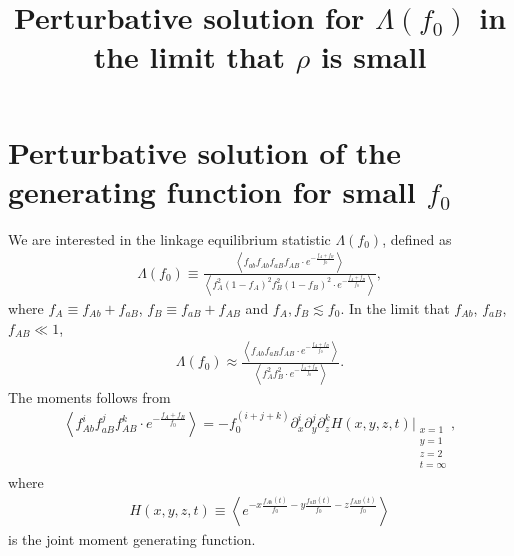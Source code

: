 \documentclass[11pt]{article}
\title{\vspace{-36 pt} \Large Perturbative solution for $\Lambda(f_0)$ in the limit that $\rho$ is small \vspace{-36 pt}}
\date{}
\begin{document}
\section*{Perturbative solution of the generating function for small $f_0$}
We are interested in the linkage equilibrium statistic $\Lambda(f_0)$, defined as
\begin{align}
    \Lambda(f_0) \equiv \frac{\left\langle f_{ab}f_{Ab}f_{aB}f_{AB} \cdot e^{-\frac{f_{A}+f_{B}}{f_0}}\right\rangle}{\left\langle f_A^2(1-f_A)^2f_B^2(1-f_B)^2\cdot e^{-\frac{f_{A}+f_{B}}{f_0}}\right\rangle},
\end{align}
where $f_A \equiv f_{Ab} + f_{aB}$, $f_B \equiv f_{aB} + f_{AB}$ and $f_A, f_B \lesssim f_0$.
In the limit that $f_{Ab}$, $f_{aB}$, $f_{AB} \ll1$, 
\begin{align}\label{eq:lambda_small_f}
    \Lambda(f_0) \approx \frac{\left\langle f_{Ab}f_{aB}f_{AB} \cdot e^{-\frac{f_{A}+f_{B}}{f_0}}\right\rangle}{\left\langle f_A^2f_B^2\cdot e^{-\frac{f_{A}+f_{B}}{f_0}}\right\rangle}.
\end{align}
The moments follows from 
\begin{align}\label{eq:lambda_numerator}
    \left\langle f_{Ab}^if_{aB}^jf_{AB}^k\cdot e^{-\frac{f_{A}+f_{B}}{f_0}}\right\rangle
    = -f_0^{(i+j+k)} \partial_x^i \partial_y^j \partial_z^k H(x, y, z, t) \Bigg\vert_{\substack{x=1 \\ y=1 \\ z=2 \\ t=\infty}},
\end{align}
where %
\begin{align}
    H(x, y, z, t) \equiv \left\langle e^{-x\frac{f_{Ab}(t)}{f_0}-y\frac{f_{aB}(t)}{f_0}-z\frac{f_{AB}(t)}{f_0}} \right\rangle 
\end{align}
is the joint moment generating function. 
\end{document}
